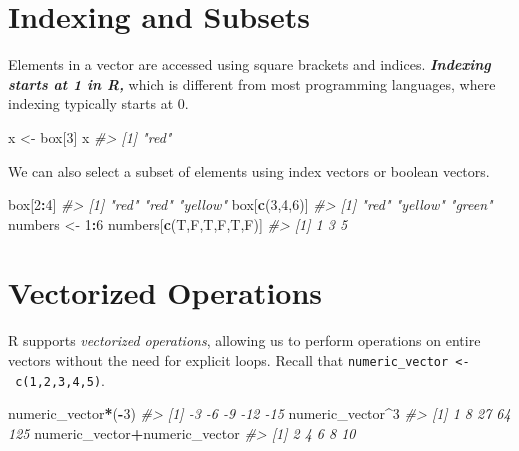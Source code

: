 \documentclass[
]{book}
\newenvironment{Shaded}{\begin{snugshade}}{\end{snugshade}}
\newcommand{\CommentTok}[1]{\textcolor[rgb]{0.56,0.35,0.01}{\textit{#1}}}
\newcommand{\DecValTok}[1]{\textcolor[rgb]{0.00,0.00,0.81}{#1}}
\newcommand{\FunctionTok}[1]{\textcolor[rgb]{0.13,0.29,0.53}{\textbf{#1}}}
\newcommand{\NormalTok}[1]{#1}
\newcommand{\OtherTok}[1]{\textcolor[rgb]{0.56,0.35,0.01}{#1}}
\newcommand{\SpecialCharTok}[1]{\textcolor[rgb]{0.81,0.36,0.00}{\textbf{#1}}}
\theoremstyle{definition}
\theoremstyle{definition}
\theoremstyle{definition}
\theoremstyle{definition}
\theoremstyle{remark}
\begin{document}
\hypertarget{indexing-and-subsets}{%
\section{Indexing and Subsets}\label{indexing-and-subsets}}

Elements in a vector are accessed using square brackets and indices. \textbf{\emph{Indexing starts at 1 in R,}} which is different from most programming languages, where indexing typically starts at 0.

\begin{Shaded}
\begin{Highlighting}[]
\NormalTok{x }\OtherTok{\textless{}{-}}\NormalTok{ box[}\DecValTok{3}\NormalTok{]}
\NormalTok{x}
\CommentTok{\#\textgreater{} [1] "red"}
\end{Highlighting}
\end{Shaded}

We can also select a subset of elements using index vectors or boolean vectors.

\begin{Shaded}
\begin{Highlighting}[]
\NormalTok{box[}\DecValTok{2}\SpecialCharTok{:}\DecValTok{4}\NormalTok{]}
\CommentTok{\#\textgreater{} [1] "red"    "red"    "yellow"}
\NormalTok{box[}\FunctionTok{c}\NormalTok{(}\DecValTok{3}\NormalTok{,}\DecValTok{4}\NormalTok{,}\DecValTok{6}\NormalTok{)]}
\CommentTok{\#\textgreater{} [1] "red"    "yellow" "green"}
\NormalTok{numbers }\OtherTok{\textless{}{-}} \DecValTok{1}\SpecialCharTok{:}\DecValTok{6}
\NormalTok{numbers[}\FunctionTok{c}\NormalTok{(T,F,T,F,T,F)]}
\CommentTok{\#\textgreater{} [1] 1 3 5}
\end{Highlighting}
\end{Shaded}

\hypertarget{vectorized-operations}{%
\section{Vectorized Operations}\label{vectorized-operations}}

R supports \emph{vectorized operations}, allowing us to perform operations on entire vectors without the need for explicit loops. Recall that \texttt{numeric\_vector\ \textless{}-\ c(1,2,3,4,5)}.

\begin{Shaded}
\begin{Highlighting}[]
\NormalTok{numeric\_vector}\SpecialCharTok{*}\NormalTok{(}\SpecialCharTok{{-}}\DecValTok{3}\NormalTok{)}
\CommentTok{\#\textgreater{} [1]  {-}3  {-}6  {-}9 {-}12 {-}15}
\NormalTok{numeric\_vector}\SpecialCharTok{\^{}}\DecValTok{3}
\CommentTok{\#\textgreater{} [1]   1   8  27  64 125}
\NormalTok{numeric\_vector}\SpecialCharTok{+}\NormalTok{numeric\_vector}
\CommentTok{\#\textgreater{} [1]  2  4  6  8 10}
\end{Highlighting}
\end{Shaded}
\end{document}
